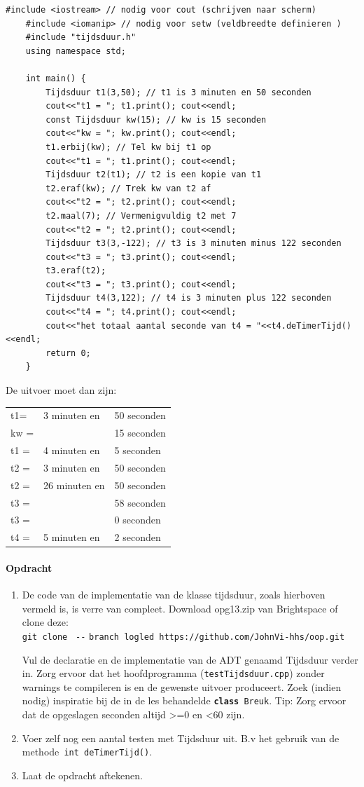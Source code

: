 \begin{lstlisting}[caption= de implementatiefile van het hoofdprogramma ,label={lst:tijdsdMainprog},numbers=none]
	#include <iostream> // nodig voor cout (schrijven naar scherm)
	#include <iomanip> // nodig voor setw (veldbreedte definieren )
	#include "tijdsduur.h"
	using namespace std;
	
	int main() {
		Tijdsduur t1(3,50); // t1 is 3 minuten en 50 seconden
		cout<<"t1 = "; t1.print(); cout<<endl;
		const Tijdsduur kw(15); // kw is 15 seconden
		cout<<"kw = "; kw.print(); cout<<endl;
		t1.erbij(kw); // Tel kw bij t1 op
		cout<<"t1 = "; t1.print(); cout<<endl;
		Tijdsduur t2(t1); // t2 is een kopie van t1
		t2.eraf(kw); // Trek kw van t2 af
		cout<<"t2 = "; t2.print(); cout<<endl;
		t2.maal(7); // Vermenigvuldig t2 met 7
		cout<<"t2 = "; t2.print(); cout<<endl;
		Tijdsduur t3(3,-122); // t3 is 3 minuten minus 122 seconden
		cout<<"t3 = "; t3.print(); cout<<endl;
		t3.eraf(t2); 
		cout<<"t3 = "; t3.print(); cout<<endl;
		Tijdsduur t4(3,122); // t4 is 3 minuten plus 122 seconden
		cout<<"t4 = "; t4.print(); cout<<endl;
		cout<<"het totaal aantal seconde van t4 = "<<t4.deTimerTijd()<<endl;
		return 0;
	}	
\end{lstlisting}
De uitvoer moet dan zijn:

\begin{tabular}{ l l l }
	t1= & 3 minuten en & 50 seconden \\ 
	kw	=& &15	seconden \\  
	t1	=&	4	minuten en&	5	seconden\\
	t2	=&	3	minuten en	&50	seconden\\
	t2	=&	26	minuten en	&50	seconden\\
	t3	=&			&58	seconden\\
	t3	=&			&0	seconden\\
	t4	=&	5	minuten en	&2	seconden
	
\end{tabular}

\paragraph{Opdracht}
\begin{enumerate}[label=\alph*]
	\item De code van de implementatie van de klasse tijdsduur, zoals hierboven vermeld is, is verre van compleet.
	Download  opg13.zip van Brightspace of clone deze:\\ 
	{\small \texttt{git clone } \verb|--| \texttt{branch logled https://github.com/JohnVi-hhs/oop.git}}
	
	Vul de declaratie en de implementatie van de ADT genaamd  Tijdsduur verder in. Zorg ervoor dat het hoofdprogramma (\texttt{testTijdsduur.cpp}) zonder warnings te compileren is en de gewenste uitvoer produceert. Zoek (indien nodig) inspiratie bij de in de les behandelde \texttt{\textbf{class} Breuk}. Tip: Zorg ervoor dat de opgeslagen seconden altijd \textgreater =0 en \textless 60 zijn.
	\item Voer zelf nog een aantal testen met Tijdsduur uit. B.v het gebruik van de methode\texttt{ int deTimerTijd()}.
	\item Laat de opdracht aftekenen.
\end{enumerate}
